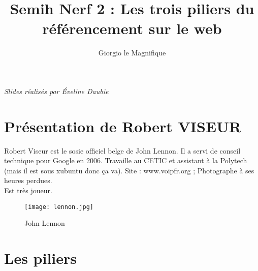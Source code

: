 \documentclass[10pt,a4paper]{article}
\author{Giorgio le Magnifique}
\title{Semih Nerf 2 : Les trois piliers du référencement sur le web}
\begin{document}
\maketitle
\textit{Slides réalisés par \'Eveline Daubie}
\section{Présentation de Robert VISEUR}
Robert Viseur est le sosie officiel belge de John Lennon. 
Il a servi de conseil technique pour Google en 2006. Travaille au CETIC et assistant à la Polytech (mais il est sous xubuntu donc ça va).  Site : www.voipfr.org ; Photographe à ses heures perdues.\\ Est très joueur.
\begin{figure}[h!]
\centering
\texttt{[image: lennon.jpg]}
\caption{John Lennon}
\end{figure}
\section{Les piliers}
\end{document}
